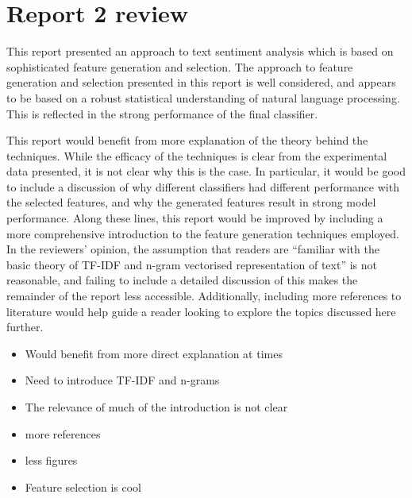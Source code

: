 \documentclass[11pt]{article}
\begin{document}
\section*{Report 2 review}
This report presented an approach to text sentiment analysis which is based on sophisticated feature generation and selection. The approach to feature generation and selection presented in this report is well considered, and appears to be based on a robust statistical understanding of natural language processing. This is reflected in the strong performance of the final classifier. 

This report would benefit from more explanation of the theory behind the techniques. While the efficacy of the techniques is clear from the experimental data presented, it is not clear why this is the case. In particular, it would be good to include a discussion of why different classifiers had different performance with the selected features, and why the generated features result in strong model performance. Along these lines, this report would be improved by including a more comprehensive introduction to the feature generation techniques employed. In the reviewers' opinion, the assumption that readers are ``familiar with the basic theory of TF-IDF and n-gram vectorised representation of text'' is not reasonable, and failing to include a detailed discussion of this makes the remainder of the report less accessible. Additionally, including more references to literature would help guide a reader looking to explore the topics discussed here further.

\begin{itemize}
    \item Would benefit from more direct explanation at times
    \item Need to introduce TF-IDF and n-grams
    \item The relevance of much of the introduction is not clear
    \item more references 
    \item less figures
    \item Feature selection is cool
\end{itemize}
\end{document}
